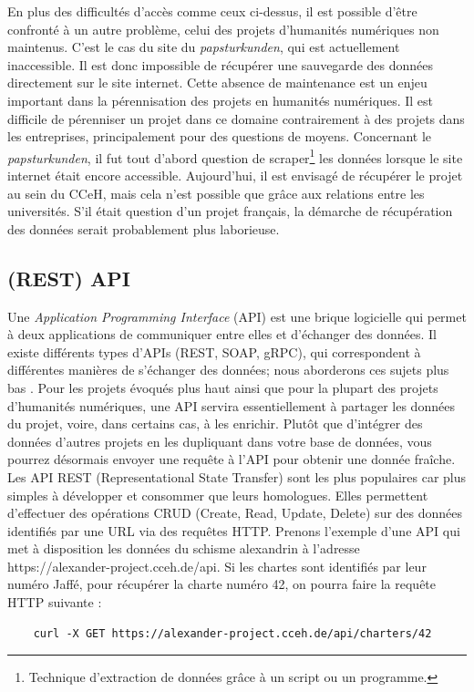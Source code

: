 En plus des difficultés d’accès comme ceux ci-dessus, il est possible d’être confronté à un autre problème, celui des projets d’humanités numériques non maintenus. C’est le cas du site du \textit{papsturkunden}, qui est actuellement inaccessible. Il est donc impossible de récupérer une sauvegarde des données directement sur le site internet. Cette absence de maintenance est un enjeu important dans la pérennisation des projets en humanités numériques. Il est difficile de pérenniser un projet dans ce domaine contrairement à des projets dans les entreprises, principalement pour des questions de moyens. Concernant le \textit{papsturkunden}, il fut tout d’abord question de scraper\footnote{Technique d’extraction de données grâce à un script ou un programme.} les données lorsque le site internet était encore accessible. Aujourd’hui, il est envisagé de récupérer le projet au sein du CCeH, mais cela n’est possible que grâce aux relations entre les universités. S’il était question d’un projet français, la démarche de récupération des données serait probablement plus laborieuse.

    
    \subsection{(REST) API}

Une \textit{Application Programming Interface} (API) est une brique logicielle qui permet à deux applications de communiquer entre elles et d’échanger des données. Il existe différents types d’APIs (REST, SOAP, gRPC), qui correspondent à différentes manières de s’échanger des données; nous aborderons ces sujets plus bas . Pour les projets évoqués plus haut ainsi que pour la plupart des projets d’humanités numériques, une API servira essentiellement à partager les données du projet, voire, dans certains cas, à les enrichir. Plutôt que d’intégrer des données d’autres projets en les dupliquant dans votre base de données, vous pourrez désormais envoyer une requête à l’API pour obtenir une donnée fraîche.  
Les API REST (Representational State Transfer) sont les plus populaires car plus simples à développer et consommer que leurs homologues. Elles permettent d’effectuer des opérations CRUD (Create, Read, Update, Delete) sur des données identifiés par une URL via des requêtes HTTP. Prenons l’exemple d’une API qui met à disposition les données du schisme alexandrin à l’adresse https://alexander-project.cceh.de/api. Si les chartes sont identifiés par leur numéro Jaffé, pour récupérer la charte numéro 42, on pourra faire la requête HTTP suivante : 
\begin{lstlisting}
    curl -X GET https://alexander-project.cceh.de/api/charters/42
\end{lstlisting}

